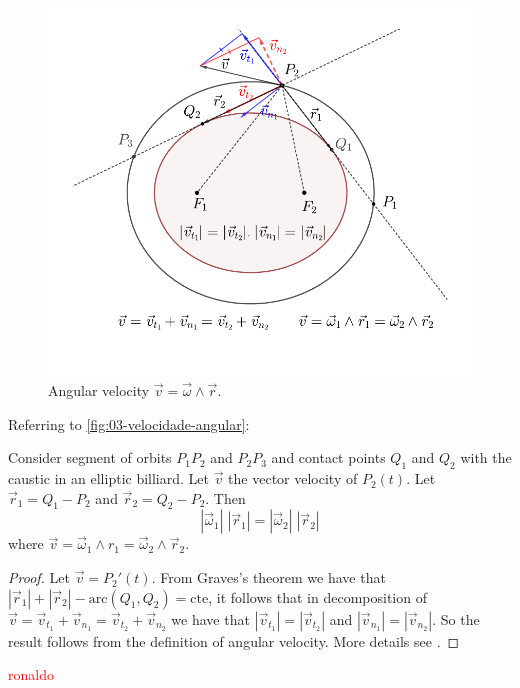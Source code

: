 \begin{figure}
    \centering
    \includegraphics[width=\textwidth]{chap_03/pics/pics-cap2-100-param-jacobi.pdf}
    \caption{ Angular velocity $\vec v=\vec \omega\wedge \vec r$. } 
    \end{figure}
Referring to \cref{fig:03-velocidade-angular}:

\begin{proposition} 
Consider   segment of orbits $P_1P_2$ and $P_2P_3$  and contact points $Q_1$ and $Q_2$ with the caustic in an elliptic billiard. Let $\vec v$ the vector velocity of $P_2(t)$. Let $\vec r_1=Q_1-P_2$ and $\vec r_2=Q_2-P_2$. Then
\[ |\vec \omega_1|\;|\vec r_1|=|\vec \omega_2|\; |\vec r_2|\]
where $\vec v=\vec\omega_1\wedge r_1= \vec\omega_2\wedge \vec r_2$.

\label{fig:03-velocidade-angular}
\end{proposition}

\begin{proof} Let $\vec v=P_2'(t)$. From Graves's theorem we have that  $|\vec r_1|+|\vec r_2|-\text{arc}(Q_1,Q_2)=\text{cte}$,  it follows that in decomposition of $\vec v=\vec v_{t_1}+\vec v_{n_1}=\vec v_{t_2}+\vec v_{n_2}$ we have that $|\vec v_{t_1}|=|\vec v_{t_2}|$ and  $|\vec v_{n_1}|=|\vec v_{n_2}|$. So the result follows from the   definition of angular velocity. More details see \cite{stachel2021-billiards-param}.
\end{proof}
 

\textcolor{red}{ronaldo}
 

